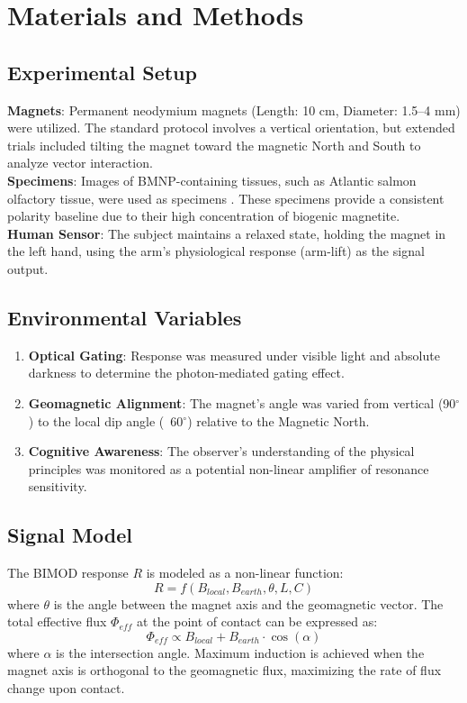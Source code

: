 \documentclass[12pt]{article}
\begin{document}
\section{Materials and Methods}
\subsection{Experimental Setup}
\textbf{Magnets}: Permanent neodymium magnets (Length: 10 cm, Diameter: 1.5--4 mm) were utilized. The standard protocol involves a vertical orientation, but extended trials included tilting the magnet toward the magnetic North and South to analyze vector interaction. \\
\textbf{Specimens}: Images of BMNP-containing tissues, such as Atlantic salmon olfactory tissue, were used as specimens \cite{gorobets2019}. These specimens provide a consistent polarity baseline due to their high concentration of biogenic magnetite. \\
\textbf{Human Sensor}: The subject maintains a relaxed state, holding the magnet in the left hand, using the arm's physiological response (arm-lift) as the signal output.

\subsection{Environmental Variables}
\begin{enumerate}
    \item \textbf{Optical Gating}: Response was measured under visible light and absolute darkness to determine the photon-mediated gating effect. 
    \item \textbf{Geomagnetic Alignment}: The magnet's angle was varied from vertical (90$^\circ$) to the local dip angle (~60$^\circ$) relative to the Magnetic North.
    \item \textbf{Cognitive Awareness}: The observer's understanding of the physical principles was monitored as a potential non-linear amplifier of resonance sensitivity.
\end{enumerate}

\subsection{Signal Model}
The BIMOD response $R$ is modeled as a non-linear function:
\[
R = f(B_{local}, B_{earth}, \theta, L, C)
\]
where $\theta$ is the angle between the magnet axis and the geomagnetic vector. The total effective flux $\Phi_{eff}$ at the point of contact can be expressed as:
\[
\Phi_{eff} \propto B_{local} + B_{earth} \cdot \cos(\alpha)
\]
where $\alpha$ is the intersection angle. Maximum induction is achieved when the magnet axis is orthogonal to the geomagnetic flux, maximizing the rate of flux change upon contact.
\end{document}
